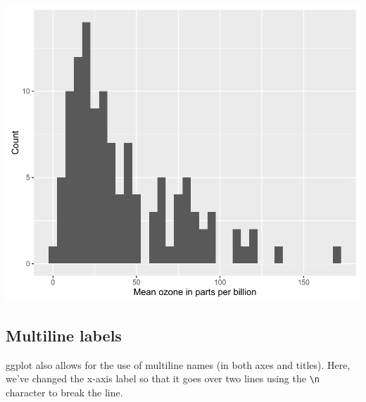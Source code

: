 \begin{Shaded}
\begin{Highlighting}[]
\StringTok{ }\NormalTok{(} \StringTok{ }
\StringTok{  }\NormalTok{(}\NormalTok{(}  \NormalTok{) +}
\StringTok{  }\NormalTok{(} \NormalTok{) +}
\StringTok{  }\NormalTok{(} \NormalTok{)}
\end{Highlighting}
\end{Shaded}

\begin{center}\includegraphics[width=0.6\linewidth]{7_Histograms_pdf/histogram_5-1} \end{center}

\subsection{Multiline labels}\label{multiline-labels}

ggplot also allows for the use of multiline names (in both axes and
titles). Here, we've changed the x-axis label so that it goes over two
lines using the \texttt{\textbackslash{}n} character to break the line.

\begin{Shaded}
\begin{Highlighting}[]
\StringTok{ }\NormalTok{(} \StringTok{ }
\StringTok{  }\NormalTok{(}\NormalTok{(}  \NormalTok{) +}
\StringTok{  }\NormalTok{(} \NormalTok{) +}
\StringTok{  }\NormalTok{(} \NormalTok{)}
\end{Highlighting}
\end{Shaded}

